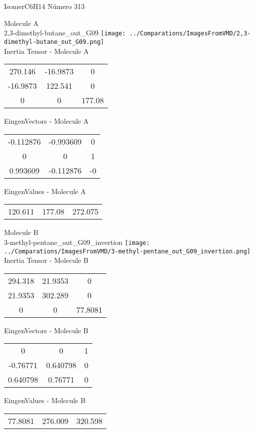 \vtab[-2cm]
\begin{center}
{\large IsomerC6H14 \tab Número 313}
\end{center}
\begin{multicols}{2}
\begin{center}

Molecule A \\ 
2,3-dimethyl-butane\_out\_G09
\texttt{[image: ../Comparations/ImagesFromVMD/2,3-dimethyl-butane\_out\_G09.png]}
\\
Inertia Tensor - Molecule A \\
\vtab

\begin{tabular}{|c c c|}
270.146	 & 	-16.9873	 & 	0	 \\
-16.9873	 & 	122.541	 & 	0	 \\
0	 & 	0	 & 	177.08
\end{tabular}

\vtab
 EingenVectors - Molecule A     \\
\vtab
\begin{tabular}{|c c c|}
-0.112876	 & 	-0.993609	 & 	0	 \\
0	 & 	0	 & 	1	 \\
0.993609	 & 	-0.112876	 & 	-0
\end{tabular}

\vtab
 EingenValues - Molecule A     \\
\vtab
\begin{tabular}{|c c c|}
120.611	 & 	177.08	 & 	272.075	 \\
\end{tabular}
\columnbreak

Molecule B \\ 
3-methyl-pentane\_out\_G09\_invertion
\texttt{[image: ../Comparations/ImagesFromVMD/3-methyl-pentane\_out\_G09\_invertion.png]}
\\
Inertia Tensor - Molecule B \\
\vtab

\begin{tabular}{|c c c|}
294.318	 & 	21.9353	 & 	0	 \\
21.9353	 & 	302.289	 & 	0	 \\
0	 & 	0	 & 	77.8081
\end{tabular}

\vtab
 EingenVectors - Molecule B     \\
\vtab
\begin{tabular}{|c c c|}
0	 & 	0	 & 	1	 \\
-0.76771	 & 	0.640798	 & 	0	 \\
0.640798	 & 	0.76771	 & 	0
\end{tabular}

\vtab
 EingenValues - Molecule B     \\
\vtab
\begin{tabular}{|c c c|}
77.8081	 & 	276.009	 & 	320.598	 \\
\end{tabular}

\end{center}
\end{multicols}
